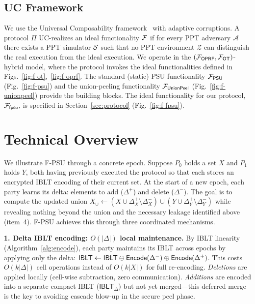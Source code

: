 \documentclass[letterpaper,twocolumn,10pt]{article}
\theoremstyle{definition}
\newcommand{\cA}{\mathcal{A}}\newcommand{\cB}{\mathcal{B}}\newcommand{\cZ}{\mathcal{Z}}
\begin{document}
\subsection{UC Framework}

We use the Universal Composability framework~\cite{Can01} with adaptive
corruptions. A protocol $\Pi$ UC-realizes an ideal functionality $\mathcal{F}$ if for
every PPT adversary $\cA$ there exists a PPT simulator $\mathcal{S}$ such that no PPT
environment $\cZ$ can distinguish the real execution from the ideal execution.
We operate in the $(\mathcal{F}_{\mathsf{OPRF}}, \mathcal{F}_{\mathsf{OT}})$-hybrid model,
where the protocol invokes the ideal functionalities defined in
Figs.~\ref{fig:f-ot},~\ref{fig:f-oprf}. The standard (static) PSU
functionality $\mathcal{F}_{\mathsf{PSU}}$ (Fig.~\ref{fig:f-psu}) and the
union-peeling functionality $\mathcal{F}_{\mathsf{UnionPeel}}$
(Fig.~\ref{fig:f-unionpeel}) provide the building blocks. The ideal
functionality for our protocol, $\mathcal{F}_{\mathsf{fpsu}}$, is specified in
Section~\ref{sec:protocol} (Fig.~\ref{fig:f-fpsu}).

\section{Technical Overview}

We illustrate F-PSU through a concrete epoch. Suppose $P_0$ holds a set $X$ and
$P_1$ holds $Y$, both having previously executed the protocol so that each
stores an encrypted IBLT encoding of their current set. At the start of a new
epoch, each party learns its delta: elements to add ($\Delta^+$) and delete
($\Delta^-$). The goal is to compute the updated union $X_\cup \leftarrow (X
\cup \Delta^+_X \setminus \Delta^-_X) \cup (Y \cup \Delta^+_Y \setminus
\Delta^-_Y)$ while revealing nothing beyond the union and the necessary leakage
identified above (item~4). F-PSU achieves this through three
coordinated mechanisms.

\smallskip\noindent\textbf{1. Delta IBLT encoding: $O(|\Delta|)$ local maintenance.}
By IBLT linearity (Algorithm~\ref{alg:encode}), each party maintains its IBLT
across epochs by applying only the delta:
$\mathsf{IBLT} \leftarrow \mathsf{IBLT} \ominus \mathsf{Encode}(\Delta^-) \oplus
\mathsf{Encode}(\Delta^+)$.
This costs $O(k|\Delta|)$ cell operations instead of $O(k|X|)$ for full
re-encoding. \emph{Deletions} are applied locally (cell-wise subtraction, zero
communication). \emph{Additions} are encoded into a separate compact IBLT
($\mathsf{IBLT}_{\Delta}$) but not yet merged---this deferred merge is the key
to avoiding cascade blow-up in the secure peel phase.
\end{document}
